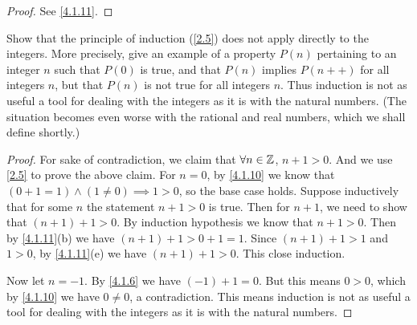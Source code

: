 \begin{proof}
  See \cref{4.1.11}.
\end{proof}

\begin{ex}\label{ex:4.1.8}
  Show that the principle of induction (\cref{2.5}) does not apply directly to the integers.
  More precisely, give an example of a property \(P(n)\) pertaining to an integer \(n\) such that \(P(0)\) is true, and that \(P(n)\) implies \(P(n++)\) for all integers \(n\), but that \(P(n)\) is not true for all integers \(n\).
  Thus induction is not as useful a tool for dealing with the integers as it is with the natural numbers.
  (The situation becomes even worse with the rational and real numbers, which we shall define shortly.)
\end{ex}

\begin{proof}
  For sake of contradiction, we claim that \(\forall n \in \mathbb{Z}\), \(n + 1 > 0\).
  And we use \cref{2.5} to prove the above claim.
  For \(n = 0\), by \cref{4.1.10} we know that \((0 + 1 = 1) \land (1 \neq 0) \implies 1 > 0\), so the base case holds.
  Suppose inductively that for some \(n\) the statement \(n + 1 > 0\) is true.
  Then for \(n + 1\), we need to show that \((n + 1) + 1 > 0\).
  By induction hypothesis we know that \(n + 1 > 0\).
  Then by \cref{4.1.11}(b) we have \((n + 1) + 1 > 0 + 1 = 1\).
  Since \((n + 1) + 1 > 1\) and \(1 > 0\), by \cref{4.1.11}(e) we have \((n + 1) + 1 > 0\).
  This close induction.

  Now let \(n = -1\).
  By \cref{4.1.6} we have \((-1) + 1 = 0\).
  But this means \(0 > 0\), which by \cref{4.1.10} we have \(0 \neq 0\), a contradiction.
  This means induction is not as useful a tool for dealing with the integers as it is with the natural numbers.
\end{proof}